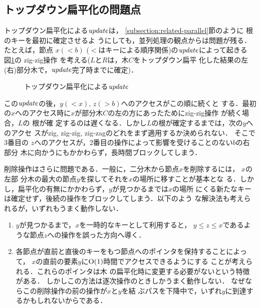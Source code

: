 \documentclass{compsoft}
\begin{document}
\subsection{トップダウン扁平化の問題点}

トップダウン扁平化による${\it update\/}$は，
\ref{subsection:related-parallel}節のように
根のキーを最初に確定させるよ
うにしても，並列処理の観点からは問題が残る．たとえば，節点
$x(<b)$ ($<$はキーによる順序関係)の${\it update\/}$によって起きる
図\ref{figure:topdown}の
zig-zig操作\cite{W90} を考える($L$と$R$は，木$C$をトップダウン扁平
化した結果の左(右)部分木で，${\it update\/}$完了時までに確定)．

\begin{figure}[tb]
\begin{center}
\end{center}
\caption{トップダウン扁平化による${\it update\/}$}
\label{figure:topdown}
\end{figure}

この${\it update\/}$の後，$y(<x)$, $z(>b)$へのアクセスがこの順に続くと
する．最初の$x$へのアクセス時に$x$が部分木$C$の左の方にあったためにzig-zig操作
が続く場合，$L$の
根が確
定するのは遅くなる．しかし$L$の根が確定するまでは，次の$y$へのアクセ
スがzig, zig-zig, zig-zagのどれをまず適用するか決められない．
% 
%
そこで3番目の
$z$へのアクセスが，2番目の操作によって影響を受けることのない$b$の右部分
木に向かうにもかかわらず，長時間ブロックしてしまう．

削除操作はさらに問題である．一般に，二分木から節点$x$を削除するには，
$x$の左部
分木の最大の節点$y$を探してそれを$x$の場所に移すことが基本とな
る．しかし，扁平化の有無にかかわらず，$y$が見つかるまでは$x$の場所
にくる新たなキーは確定せず，後続の操作をブロックしてしまう．以下のよう
な解決法も考えられるが，いずれもうまく動作しない．

\begin{enumerate}
\item %
$y$が見つかるまで，$x$を一時的なキーとして利用すると，
$y\le z\le x$であるような節点$z$への操作を誤った方向へ導く．

\item %
各節点が直前と直後のキーをもつ節点へのポインタを保持することによって，
$x$の直前の要素$y$に${\rm O}(1)$時間でアクセスできるようにする
ことが考えられる．これらのポインタは木
の扁平化時に変更する必要がないという特徴がある．
% 
しかしこの方法は逐次操作のときしかうまく動作しない．
% 
%
なぜならこの削除操作の前の操作が$x$と$y$を結
ぶパスを下降中で，いずれ$y$に到達するかもしれないからである．
\end{enumerate}
\end{document}
